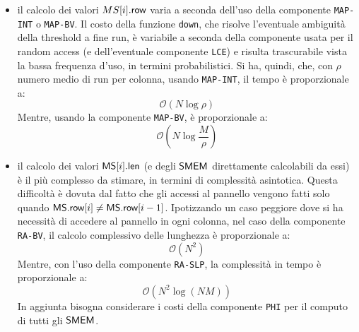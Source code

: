 \begin{itemize}
  \item il calcolo dei valori $MS[i].\mbox{\rm {\sf row}}$ varia a
  seconda dell'uso 
  della componente \texttt{MAP-INT} o \texttt{MAP-BV}. Il costo della funzione
  \texttt{down}, che risolve l'eventuale ambiguità della threshold a fine run,
  è variabile a seconda della componente usata per il random access (e 
  dell'eventuale componente \texttt{LCE}) e risulta trascurabile vista la bassa
  frequenza d'uso, in termini probabilistici. Si ha, quindi, che, con $\rho$
  numero medio di run per colonna, usando \texttt{MAP-INT}, il tempo è
  proporzionale a:
  \begin{equation}
    \label{eq:msthr1int}
    \mathcal{O}(N\log\rho)
  \end{equation}
  Mentre, usando la componente \texttt{MAP-BV}, è proporzionale a:
  \begin{equation}
    \label{eq:msthr1bv}
    \mathcal{O}\left(N\log\frac{M}{\rho}\right)
  \end{equation}
  \item il calcolo dei valori $\mbox{\rm {\sf MS}}[i].\mbox{\rm {\sf len}}$ (e degli $\mbox{\rm {\sf SMEM}}$ direttamente
  calcolabili da essi) è il
  più complesso da 
  stimare, in termini di complessità asintotica. Questa difficoltà è dovuta dal
  fatto che gli accessi al pannello vengono fatti solo quando $\mbox{\rm {\sf MS}}.\mbox{\rm {\sf row}}[i]\neq
  \mbox{\rm {\sf MS}}.\mbox{\rm {\sf row}}[i-1]$.
  Ipotizzando un caso peggiore dove si ha necessità di accedere al pannello in
  ogni 
  colonna, nel caso della componente \texttt{RA-BV}, il calcolo
  complessivo delle lunghezza è proporzionale a:
  \begin{equation}
    \label{eq:msthr2bv}
    \mathcal{O}(N^2)
  \end{equation}
  Mentre, con l'uso della componente \texttt{RA-SLP}, la complessità in tempo
  è proporzionale a: 
  \begin{equation}
    \label{eq:msthr2slp}
    \mathcal{O}\left(N^2\log (NM)\right)
  \end{equation} 
  In aggiunta bisogna considerare i costi della componente \texttt{PHI} per il
  computo di tutti gli $\mbox{\rm {\sf SMEM}}$.
\end{itemize}
